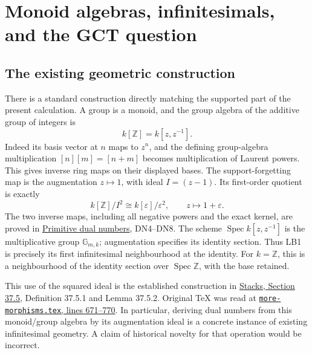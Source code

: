 \documentclass[
]{article}
\author{}
\date{}
\begin{document}
{
\setcounter{tocdepth}{3}
\tableofcontents
}
\section{Monoid algebras, infinitesimals, and the GCT
question}\label{monoid-algebras-infinitesimals-and-the-gct-question}

\subsection{The existing geometric
construction}\label{the-existing-geometric-construction}

There is a standard construction directly matching the supported part of
the present calculation. A group is a monoid, and the group algebra of
the additive group of integers is \[
k[\mathbb Z]=k[z,z^{-1}].
\] Indeed its basis vector at \(n\) maps to \(z^n\), and the defining
group-algebra multiplication \([n][m]=[n+m]\) becomes multiplication of
Laurent powers. This gives inverse ring maps on their displayed bases.
The support-forgetting map is the augmentation \(z\mapsto1\), with ideal
\(I=(z-1)\). Its first-order quotient is exactly \[
k[\mathbb Z]/I^2\cong k[\varepsilon]/\varepsilon^2,
\qquad z\mapsto1+\varepsilon.
\tag{LB1}
\] The two inverse maps, including all negative powers and the exact
kernel, are proved in
\href{https://github.com/KokunoYumeto/zeta-function-research-reader/blob/6af54ea3c8ef99127af327f3103e086c68d482c2/workbenches/splitzero-tandem/branches/identity-absorber-square/PRIMITIVE_DUAL_NUMBERS.md}{Primitive
dual numbers}, DN4--DN8. The scheme \(\operatorname{Spec}k[z,z^{-1}]\)
is the multiplicative group \(\mathbb G_{m,k}\); augmentation specifies
its identity section. Thus LB1 is precisely its first infinitesimal
neighbourhood at the identity. For \(k=\mathbb Z\), this is a
neighbourhood of the identity section over
\(\operatorname{Spec}\mathbb Z\), with the base retained.

This use of the squared ideal is the established construction in
\href{https://stacks.math.columbia.edu/tag/05YW}{Stacks, Section 37.5},
Definition 37.5.1 and Lemma 37.5.2. Original TeX was read at
\href{https://github.com/stacks/stacks-project/blob/a04446e57ec1fbc252a871afcec7752fb2807b14/more-morphisms.tex\#L671}{\texttt{more-morphisms.tex},
lines 671--770}. In particular, deriving dual numbers from this
monoid/group algebra by its augmentation ideal is a concrete instance of
existing infinitesimal geometry. A claim of historical novelty for that
operation would be incorrect.
\end{document}
